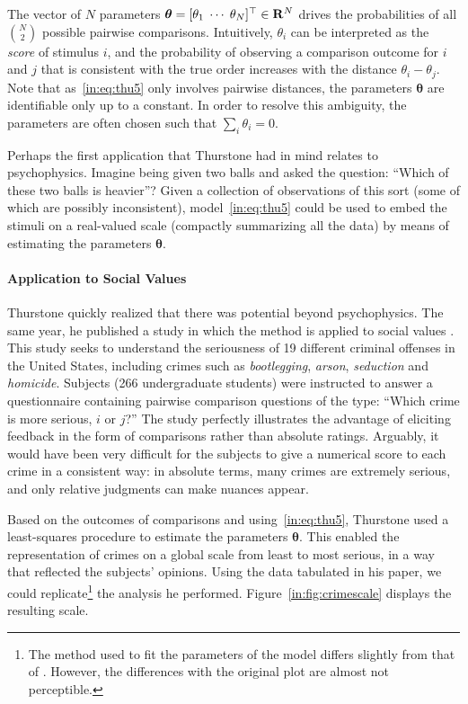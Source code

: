 The vector of $N$ parameters $\bm{\theta} = [\theta_1 \; \cdots \; \theta_N]^\top \in \mathbf{R}^N$ drives the probabilities of all $\binom{N}{2}$ possible pairwise comparisons.
Intuitively, $\theta_i$ can be interpreted as the \emph{score} of stimulus $i$, and the probability of observing a comparison outcome for $i$ and $j$ that is consistent with the true order increases with the distance $\theta_i - \theta_j$.
Note that as~\eqref{in:eq:thu5} only involves pairwise distances, the parameters $\bm{\theta}$ are identifiable only up to a constant.
In order to resolve this ambiguity, the parameters are often chosen such that $\sum_i \theta_i = 0$.

Perhaps the first application that Thurstone had in mind relates to psychophysics.
Imagine being given two balls and asked the question: ``Which of these two balls is heavier''?
Given a collection of observations of this sort (some of which are possibly inconsistent), model~\eqref{in:eq:thu5} could be used to embed the stimuli on a real-valued scale (compactly summarizing all the data) by means of estimating the parameters $\bm{\theta}$.

\paragraph{Application to Social Values}
Thurstone quickly realized that there was potential beyond psychophysics.
The same year, he published a study in which the method is applied to social values \citep{thurstone1927method}.
This study seeks to understand the seriousness of \num{19} different criminal offenses in the United States, including crimes such as \emph{bootlegging}, \emph{arson}, \emph{seduction} and \emph{homicide}.
Subjects (266 undergraduate students) were instructed to answer a questionnaire containing pairwise comparison questions of the type: ``Which crime is more serious, $i$ or $j$?''
The study perfectly illustrates the advantage of eliciting feedback in the form of comparisons rather than absolute ratings.
Arguably, it would have been very difficult for the subjects to give a numerical score to each crime in a consistent way: in absolute terms, many crimes are extremely serious, and only relative judgments can make nuances appear.

Based on the outcomes of comparisons and using~\eqref{in:eq:thu5}, Thurstone used a least-squares procedure to estimate the parameters $\bm{\theta}$.
This enabled the representation of crimes on a global scale from least to most serious, in a way that reflected the subjects' opinions.
Using the data tabulated in his \citeyear{thurstone1927method} paper, we could replicate\footnote{%
The method used to fit the parameters of the model differs slightly from that of \citet{thurstone1927method}.
However, the differences with the original plot are almost not perceptible.} the analysis he performed.
Figure~\ref{in:fig:crimescale} displays the resulting scale.


